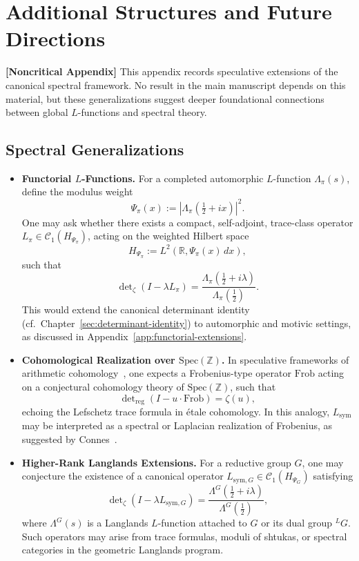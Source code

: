 \section{Additional Structures and Future Directions}
\label{app:additional-structures}

\noindent\textbf{[Noncritical Appendix]}  
This appendix records speculative extensions of the canonical spectral framework. No result in the main manuscript depends on this material, but these generalizations suggest deeper foundational connections between global \( L \)-functions and spectral theory.

\subsection*{Spectral Generalizations}

\begin{itemize}
  \item \textbf{Functorial \( L \)-Functions.}  
  For a completed automorphic \( L \)-function \( \Lambda_\pi(s) \), define the modulus weight
  \[
  \Psi_\pi(x) := \left| \Lambda_\pi\left( \tfrac{1}{2} + i x \right) \right|^2.
  \]
  One may ask whether there exists a compact, self-adjoint, trace-class operator \( L_\pi \in \mathcal{C}_1(H_{\Psi_\pi}) \), acting on the weighted Hilbert space
  \[
  H_{\Psi_\pi} := L^2(\mathbb{R}, \Psi_\pi(x) \, dx),
  \]
  such that
  \[
  \det\nolimits_\zeta(I - \lambda L_\pi) = \frac{\Lambda_\pi(\tfrac{1}{2} + i\lambda)}{\Lambda_\pi(\tfrac{1}{2})}.
  \]
  This would extend the canonical determinant identity (cf.~Chapter~\ref{sec:determinant-identity}) to automorphic and motivic settings, as discussed in Appendix~\ref{app:functorial-extensions}.

  \item \textbf{Cohomological Realization over \( \mathrm{Spec}(\mathbb{Z}) \).}  
  In speculative frameworks of arithmetic cohomology~\cite{Deninger1998Frobenius}, one expects a Frobenius-type operator \( \mathrm{Frob} \) acting on a conjectural cohomology theory of \( \mathrm{Spec}(\mathbb{Z}) \), such that
  \[
  \det\nolimits_{\mathrm{reg}}(I - u \cdot \mathrm{Frob}) = \zeta(u),
  \]
  echoing the Lefschetz trace formula in étale cohomology. In this analogy, \( L_{\mathrm{sym}} \) may be interpreted as a spectral or Laplacian realization of Frobenius, as suggested by Connes~\cite{Connes1999TraceFormula}.

  \item \textbf{Higher-Rank Langlands Extensions.}  
  For a reductive group \( G \), one may conjecture the existence of a canonical operator \( L_{\mathrm{sym},G} \in \mathcal{C}_1(H_{\Psi_G}) \) satisfying
  \[
  \det\nolimits_\zeta(I - \lambda L_{\mathrm{sym},G}) = \frac{\Lambda^G(\tfrac{1}{2} + i\lambda)}{\Lambda^G(\tfrac{1}{2})},
  \]
  where \( \Lambda^G(s) \) is a Langlands \( L \)-function attached to \( G \) or its dual group \( ^L G \). Such operators may arise from trace formulas, moduli of shtukas, or spectral categories in the geometric Langlands program.
\end{itemize}

